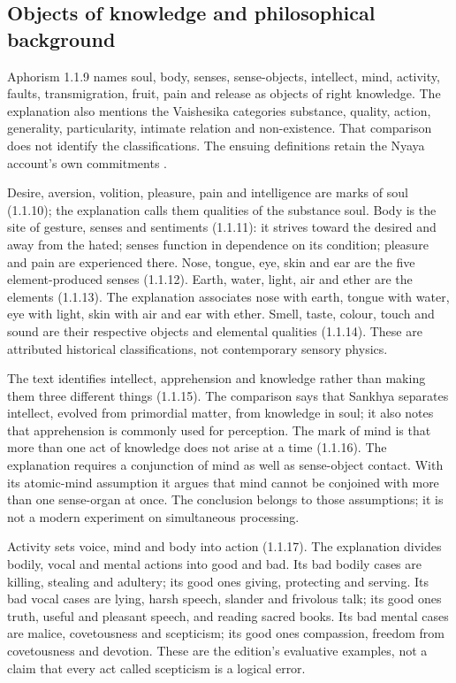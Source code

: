 \subsection{Objects of knowledge and philosophical background}

Aphorism 1.1.9 names soul, body, senses, sense-objects, intellect, mind, activity,
faults, transmigration, fruit, pain and release as objects of right knowledge.
The explanation also mentions the Vaishesika categories substance, quality,
action, generality, particularity, intimate relation and non-existence. That
comparison does not identify the classifications. The ensuing definitions
retain the Nyaya account's own commitments
\cite[1.1.9--22, pp.~5--7]{GotamaVidyabhusana1913NyayaSutras}.

Desire, aversion, volition, pleasure, pain and intelligence are marks of soul
(1.1.10); the explanation calls them qualities of the substance soul.
Body is the site of gesture, senses and sentiments (1.1.11): it strives
toward the desired and away from the hated; senses function in dependence
on its condition; pleasure and pain are experienced there.
Nose, tongue, eye, skin and ear are the five element-produced senses (1.1.12).
Earth, water, light, air and ether are the elements (1.1.13).
The explanation associates nose with earth, tongue with water, eye with light,
skin with air and ear with ether. Smell, taste, colour, touch and sound are
their respective objects and elemental qualities (1.1.14).
These are attributed historical classifications, not contemporary sensory physics.

The text identifies intellect, apprehension and knowledge rather than making
them three different things (1.1.15). The comparison says that Sankhya separates
intellect, evolved from primordial matter, from knowledge in soul; it also notes
that apprehension is commonly used for perception.
The mark of mind is that more than one act of knowledge does not arise at a
time (1.1.16). The explanation requires a conjunction of mind as well as
sense-object contact. With its atomic-mind assumption it argues that mind cannot
be conjoined with more than one sense-organ at once. The conclusion belongs to
those assumptions; it is not a modern experiment on simultaneous processing.

Activity sets voice, mind and body into action (1.1.17). The explanation divides
bodily, vocal and mental actions into good and bad. Its bad bodily cases are
killing, stealing and adultery; its good ones giving, protecting and serving.
Its bad vocal cases are lying, harsh speech, slander and frivolous talk;
its good ones truth, useful and pleasant speech, and reading sacred books.
Its bad mental cases are malice, covetousness and scepticism; its good ones
compassion, freedom from covetousness and devotion. These are the edition's
evaluative examples, not a claim that every act called scepticism is a logical error.

